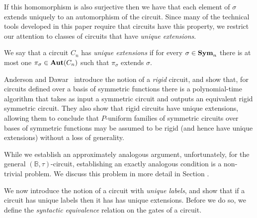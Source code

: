 \documentclass[../paper.tex]{subfiles}
\begin{document}
If this homomorphism is also surjective then we have that each element of
$\sigma$ extends uniquely to an automorphism of the circuit. Since many of the
technical tools developed in this paper require that circuits have this
property, we restrict our attention to classes of circuits that have
\emph{unique extensions}.

\begin{definition}
  We say that a circuit $C_n$ has \emph{unique extensions} if for every $\sigma
  \in \text{\textbf{Sym}}_n$ there is at most one $\pi_{\sigma} \in \text{\textbf{Aut}}(C_n)$ such that
  $\pi_{\sigma}$ extends $\sigma$.
\end{definition}

Anderson and Dawar~\cite{AndersonD17} introduce the notion of a \emph{rigid}
circuit, and show that, for circuits defined over a basis of symmetric functions
there is a polynomial-time algorithm that takes as input a symmetric circuit and
outputs an equivalent rigid symmetric circuit. They also show that rigid
circuits have unique extensions, allowing them to conclude that $P$-uniform
families of symmetric circuits over bases of symmetric functions may be assumed
to be rigid (and hence have unique extensions) without a loss of generality.

While we establish an approximately analogous argument, unfortunately, for the
general $(\mathbb{B}, \tau)$-circuit, establishing an exactly analogous
condition is a non-trivial problem. We discuss this problem in more detail in
Section \label{sec:transparency-and-unique-extensions}.

We now introduce the notion of a circuit with \emph{unique labels}, and show
that if a circuit has unique labels then it has has unique extensions. Before we
do so, we define the \emph{syntactic equivalence} relation on the gates of a
circuit.


\end{document}
